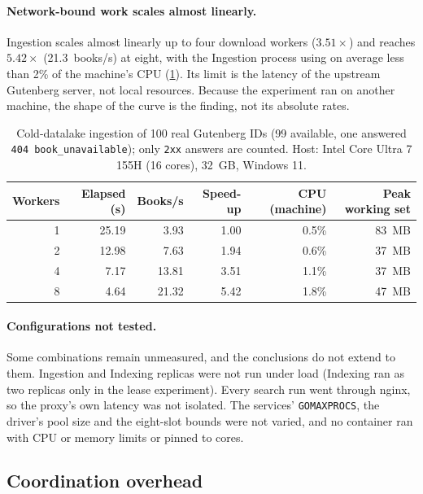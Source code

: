 \documentclass[10pt,a4paper]{article}
\newcommand{\code}[1]{\texttt{#1}}
\begin{document}
\paragraph{Network-bound work scales almost linearly.}
Ingestion scales almost linearly up to four download workers ($3.51\times$) and
reaches $5.42\times$ (21.3~books/s) at eight, with the Ingestion process using
on average less than 2\% of the machine's CPU (\cref{tab:ingestion}). Its limit
is the latency of the upstream Gutenberg server, not local resources. Because
the experiment ran on another machine, the shape of the curve is the finding,
not its absolute rates.

\begin{table}[htbp]
  \centering
  \footnotesize
  \caption{Cold-datalake ingestion of 100 real Gutenberg IDs (99 available, one
  answered \code{404 book\_unavailable}); only \code{2xx} answers are counted.
  Host: Intel Core Ultra 7 155H (16 cores), 32~GB, Windows 11.}
  \label{tab:ingestion}
  \begin{tabular}{@{}rrrrrr@{}}
    \toprule
    Workers & Elapsed (s) & Books/s & Speed-up & CPU (machine) & Peak working set \\
    \midrule
    1 & 25.19 & 3.93  & 1.00 & 0.5\% & 83~MB \\
    2 & 12.98 & 7.63  & 1.94 & 0.6\% & 37~MB \\
    4 & 7.17  & 13.81 & 3.51 & 1.1\% & 37~MB \\
    8 & 4.64  & 21.32 & 5.42 & 1.8\% & 47~MB \\
    \bottomrule
  \end{tabular}
\end{table}

\paragraph{Configurations not tested.}
Some combinations remain unmeasured, and the conclusions do not extend to
them. Ingestion and Indexing replicas were not run under load (Indexing ran as
two replicas only in the lease experiment). Every search run went through
nginx, so the proxy's own latency was not isolated. The services'
\code{GOMAXPROCS}, the driver's pool size and the eight-slot bounds were not
varied, and no container ran with CPU or memory limits or pinned to cores.

\subsection{Coordination overhead}
\label{sec:bench-coordination}
\end{document}
